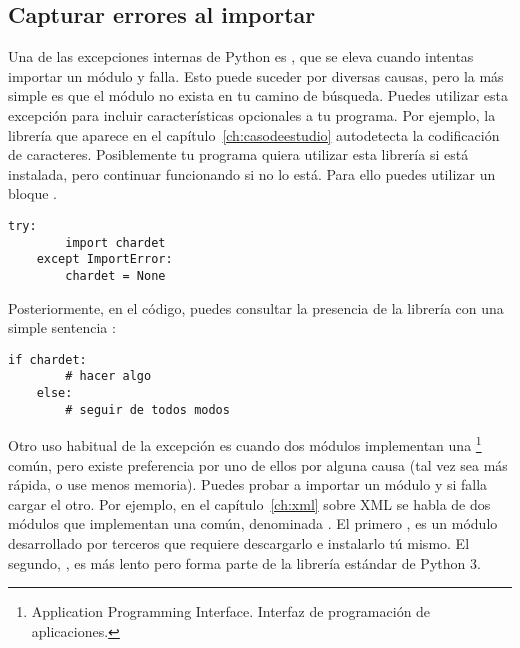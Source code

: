 \subsection {Capturar errores al importar}

Una de las excepciones internas de Python es , que se eleva cuando intentas importar un módulo y falla. Esto puede suceder por diversas causas, pero la más simple es que el módulo no exista en tu camino de búsqueda. Puedes utilizar esta excepción para incluir características opcionales a tu programa. Por ejemplo, la librería  que aparece en el capítulo~\ref{ch:casodeestudio} autodetecta la codificación de caracteres. Posiblemente tu programa quiera utilizar esta librería si está instalada, pero continuar funcionando si no lo está. Para ello puedes utilizar un bloque .

\noindent\begin{minipage}{\textwidth}
\begin{lstlisting}[mathescape=True]
    try:
        import chardet
    except ImportError:
        chardet = None
\end{lstlisting}
\end{minipage}

Posteriormente, en el código, puedes consultar la presencia de la librería con una simple sentencia :

\noindent\begin{minipage}{\textwidth}
\begin{lstlisting}[mathescape=True]
    if chardet:
        # hacer algo
    else:
        # seguir de todos modos
\end{lstlisting}
\end{minipage}

Otro uso habitual de la excepción  es cuando dos módulos implementan una \footnote{Application Programming Interface. Interfaz de programación de aplicaciones.} común, pero existe preferencia por uno de ellos por alguna causa (tal vez sea más rápida, o use menos memoria). Puedes probar a importar un módulo y si falla cargar el otro. Por ejemplo, en el capítulo~\ref{ch:xml} sobre XML se habla de dos módulos que implementan una  común, denominada . El primero , es un módulo desarrollado por terceros que requiere descargarlo e instalarlo tú mismo. El segundo, , es más lento pero forma parte de la librería estándar de Python 3.

